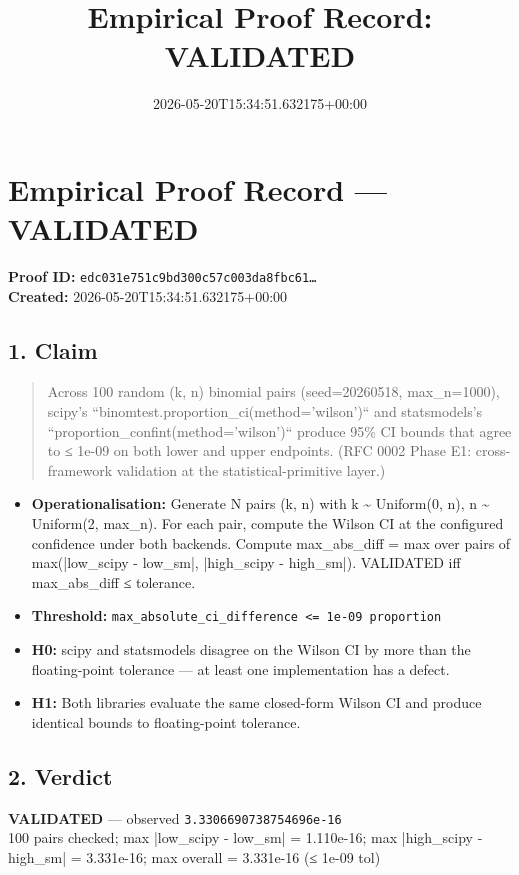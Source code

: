 \documentclass{article}
\title{Empirical Proof Record: VALIDATED}
\date{2026-05-20T15:34:51.632175+00:00}
\begin{document}
\maketitle
\section*{Empirical Proof Record --- \textcolor{validated}{\textbf{VALIDATED}}}
\textbf{Proof ID:} \texttt{edc031e751c9bd300c57c003da8fbc61\dots}\\
\textbf{Created:} 2026-05-20T15:34:51.632175+00:00
\subsection*{1. Claim}
\begin{quote}Across 100 random (k, n) binomial pairs (seed=20260518, max\_n=1000), scipy's ``binomtest.proportion\_ci(method='wilson')`` and statsmodels's ``proportion\_confint(method='wilson')`` produce 95\% CI bounds that agree to ≤ 1e-09 on both lower and upper endpoints. (RFC 0002 Phase E1: cross-framework validation at the statistical-primitive layer.)\end{quote}
\begin{itemize}
\item \textbf{Operationalisation:} Generate N pairs (k, n) with k \textasciitilde{} Uniform(0, n), n \textasciitilde{} Uniform(2, max\_n). For each pair, compute the Wilson CI at the configured confidence under both backends. Compute max\_abs\_diff = max over pairs of max(|low\_scipy - low\_sm|, |high\_scipy - high\_sm|). VALIDATED iff max\_abs\_diff ≤ tolerance.
\item \textbf{Threshold:} \texttt{max\_absolute\_ci\_difference <= 1e-09 proportion}
\item \textbf{H0:} scipy and statsmodels disagree on the Wilson CI by more than the floating-point tolerance — at least one implementation has a defect.
\item \textbf{H1:} Both libraries evaluate the same closed-form Wilson CI and produce identical bounds to floating-point tolerance.
\end{itemize}
\subsection*{2. Verdict}
\textcolor{validated}{\textbf{VALIDATED}} --- observed \texttt{3.3306690738754696e-16}\\
100 pairs checked; max |low\_scipy - low\_sm| = 1.110e-16; max |high\_scipy - high\_sm| = 3.331e-16; max overall = 3.331e-16 (≤ 1e-09 tol)
\end{document}
